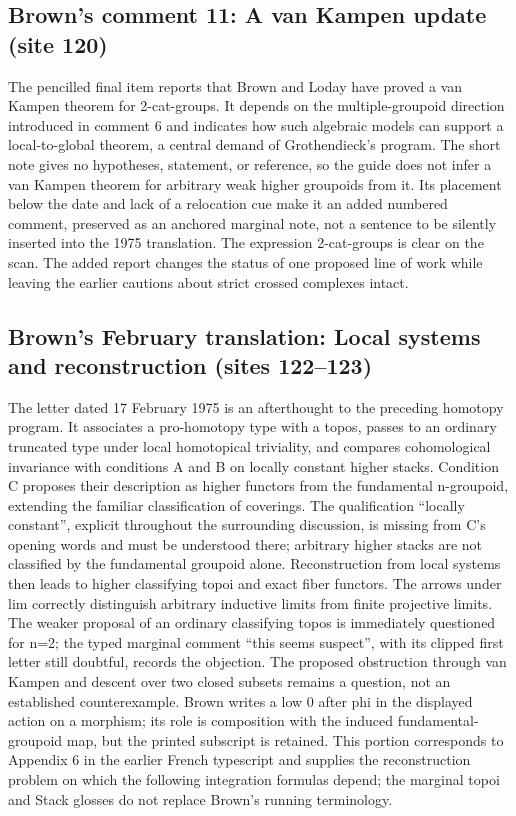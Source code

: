 \subsection*{Brown's comment 11: A van Kampen update (site 120)}
The pencilled final item reports that Brown and Loday have proved a van Kampen theorem for 2-cat-groups. It depends on the multiple-groupoid direction introduced in comment 6 and indicates how such algebraic models can support a local-to-global theorem, a central demand of Grothendieck's program. The short note gives no hypotheses, statement, or reference, so the guide does not infer a van Kampen theorem for arbitrary weak higher groupoids from it. Its placement below the date and lack of a relocation cue make it an added numbered comment, preserved as an anchored marginal note, not a sentence to be silently inserted into the 1975 translation. The expression 2-cat-groups is clear on the scan. The added report changes the status of one proposed line of work while leaving the earlier cautions about strict crossed complexes intact.

\subsection*{Brown's February translation: Local systems and reconstruction (sites 122--123)}
The letter dated 17 February 1975 is an afterthought to the preceding homotopy program. It associates a pro-homotopy type with a topos, passes to an ordinary truncated type under local homotopical triviality, and compares cohomological invariance with conditions A and B on locally constant higher stacks. Condition C proposes their description as higher functors from the fundamental n-groupoid, extending the familiar classification of coverings. The qualification ``locally constant'', explicit throughout the surrounding discussion, is missing from C's opening words and must be understood there; arbitrary higher stacks are not classified by the fundamental groupoid alone. Reconstruction from local systems then leads to higher classifying topoi and exact fiber functors. The arrows under lim correctly distinguish arbitrary inductive limits from finite projective limits. The weaker proposal of an ordinary classifying topos is immediately questioned for n=2; the typed marginal comment ``this seems suspect'', with its clipped first letter still doubtful, records the objection. The proposed obstruction through van Kampen and descent over two closed subsets remains a question, not an established counterexample. Brown writes a low 0 after phi in the displayed action on a morphism; its role is composition with the induced fundamental-groupoid map, but the printed subscript is retained. This portion corresponds to Appendix 6 in the earlier French typescript and supplies the reconstruction problem on which the following integration formulas depend; the marginal topoi and Stack glosses do not replace Brown's running terminology.

